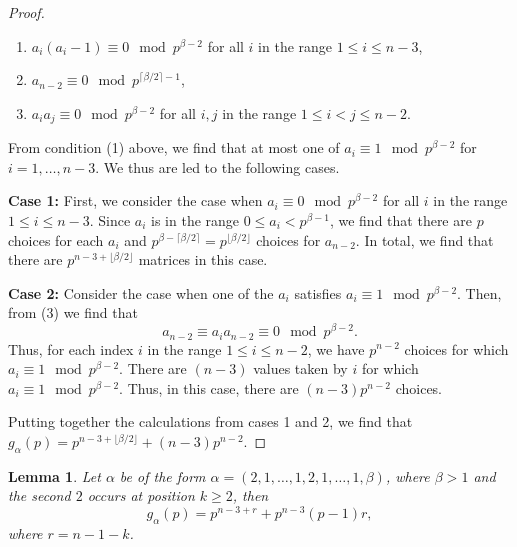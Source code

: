 \documentclass[a4paper]{amsart}
\newtheorem{lemma}[theorem]{Lemma}
\numberwithin{equation}{section}
\theoremstyle{remark}
\begin{document}
\begin{proof}
	\begin{enumerate}
	    \item $a_i(a_i-1)\equiv 0\mod{p^{\beta-2}}$ for all $i$ in the range $1\leq i\leq n-3$,
	    \item $a_{n-2}\equiv 0\mod{p^{\lceil\beta/2\rceil-1}}$,
	    \item $a_i a_j\equiv 0\mod{p^{\beta-2}}$ for all $i,j$ in the range $1\leq i<j\leq n-2$.
	\end{enumerate}
	From condition (1) above, we find that at most one of $a_i\equiv 1\mod{p^{\beta-2}}$ for $i=1, \dots, n-3$. We thus are led to the following cases.
	\par \textbf{Case 1:} First, we consider the case when $a_i\equiv 0\mod{p^{\beta-2}}$ for all $i$ in the range $1\leq i\leq n-3$. Since $a_i$ is in the range $0\leq a_i<p^{\beta-1}$, we find that there are $p$ choices for each $a_i$ and $p^{\beta-\lceil \beta/2\rceil}=p^{\lfloor \beta/2\rfloor}$ choices for $a_{n-2}$. In total, we find that there are $p^{n-3+\lfloor \beta/2\rfloor}$ matrices in this case.
	\par \textbf{Case 2:} Consider the case when one of the $a_i$ satisfies $a_i\equiv 1\mod{p^{\beta-2}}$. Then, from (3) we find that \[a_{n-2}\equiv a_i a_{n-2}\equiv 0\mod{p^{\beta-2}}.\] Thus, for each index $i$ in the range $1\leq i\leq n-2$, we have $p^{n-2}$ choices for which $a_i\equiv 1\mod{p^{\beta-2}}$. There are $(n-3)$ values taken by $i$ for which $a_i\equiv 1\mod{p^{\beta-2}}$. Thus, in this case, there are $(n-3)p^{n-2}$ choices. 
	
\par Putting together the calculations from cases 1 and 2, we find that $g_\alpha(p)=p^{n-3+\lfloor \beta/2\rfloor}+(n-3)p^{n-2}$.
 \end{proof}
 
 \begin{lemma}\label{lemma 2}
 Let $\alpha$ be of the form $\alpha=(2,1,\dots, 1, 2, 1,\dots, 1, \beta)$, where $\beta>1$ and the second $2$ occurs at position $k\geq 2$, then
 \[g_\alpha(p)=p^{n-3+r}+p^{n-3}(p-1)r,\]
 where $r=n-1-k$.
 \end{lemma}
 
\end{document}
